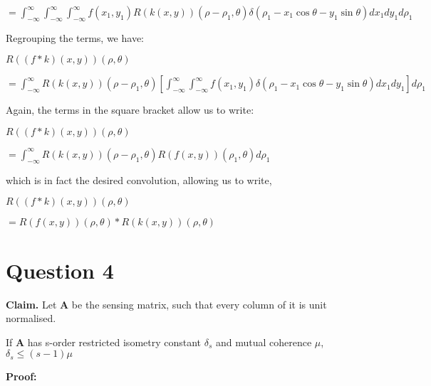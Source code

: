\documentclass[fleqn, 11pt]{article}
\newcommand{\bs}[1]{\boldsymbol{#1}}
\begin{document}
\smallskip

$
=   \displaystyle \int_{-\infty }^{\infty} \int_{-\infty }^{\infty} \int_{-\infty }^{\infty} f(x_1,y_1)  
R(k(x,y))(\rho - \rho_1, \theta) \delta ( \rho_1 - x_1 \cos \theta - y_1 \sin \theta  )
dx_1 dy_1 d \rho_1   $


\bigskip


Regrouping the terms, we have: 


\medskip 

$R((f * k) (x,y)) (\rho, \theta) 
$


\smallskip

$
=   \displaystyle \int_{-\infty }^{\infty} R(k(x,y))(\rho - \rho_1, \theta) \left[ \int_{-\infty }^{\infty} \int_{-\infty }^{\infty} f(x_1,y_1)  
 \delta ( \rho_1 - x_1 \cos \theta - y_1 \sin \theta  )
dx_1 dy_1 \right] d \rho_1   $


\bigskip

Again, the terms in the square bracket allow us to write: 


\medskip 

$R((f * k) (x,y)) (\rho, \theta) 
$


\smallskip

$
=   \displaystyle \int_{-\infty }^{\infty} R(k(x,y))(\rho - \rho_1, \theta) 
R(f(x,y)) (\rho_1, \theta ) 
d \rho_1   $


\bigskip

which is in fact the desired convolution, allowing us to write,


\medskip 

$R((f * k) (x,y)) (\rho, \theta) 
$


\smallskip

$
= R(f(x,y))  (\rho, \theta)  * R(k(x,y))  (\rho, \theta) 
$


\bigskip



\newpage
\section*{Question 4}
\setcounter{equation}{0}

\textbf{Claim. } Let $\bs{A}$ be the sensing matrix, 
such that every column of it is unit normalised.

If $\bs{A}$ has s-order restricted isometry constant $\delta_s$ 
and mutual coherence $\mu$, 
$\delta_s \leq (s-1) \mu $ 


\hrulefill 


\textbf{Proof:}
\smallskip
\end{document}
